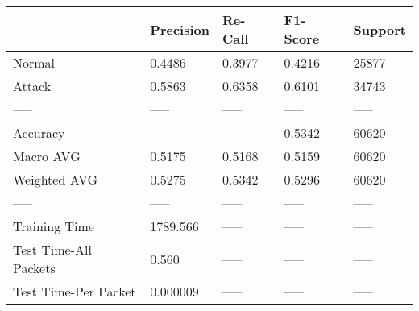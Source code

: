 \begin{tabular}{lllll}
\toprule
{} & Precision & Re-Call & F1-Score & Support \\
\midrule
Normal                &    0.4486 &  0.3977 &   0.4216 &   25877 \\
Attack                &    0.5863 &  0.6358 &   0.6101 &   34743 \\
-----                 &     ----- &   ----- &    ----- &   ----- \\
Accuracy              &           &         &   0.5342 &   60620 \\
Macro AVG             &    0.5175 &  0.5168 &   0.5159 &   60620 \\
Weighted AVG          &    0.5275 &  0.5342 &   0.5296 &   60620 \\
-----                 &     ----- &   ----- &    ----- &   ----- \\
Training Time         &  1789.566 &   ----- &    ----- &   ----- \\
Test Time-All Packets &     0.560 &   ----- &    ----- &   ----- \\
Test Time-Per Packet  &  0.000009 &   ----- &    ----- &   ----- \\
\bottomrule
\end{tabular}
